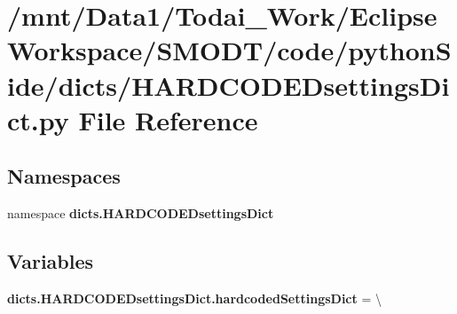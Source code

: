 \section{/mnt/\-Data1/\-Todai\-\_\-\-Work/\-Eclipse\-Workspace/\-S\-M\-O\-D\-T/code/python\-Side/dicts/\-H\-A\-R\-D\-C\-O\-D\-E\-Dsettings\-Dict.py File Reference}
\label{_h_a_r_d_c_o_d_e_dsettings_dict_8py}
\subsection*{Namespaces}
\begin{DoxyCompactItemize}
\item 
namespace {\bf dicts.\-H\-A\-R\-D\-C\-O\-D\-E\-Dsettings\-Dict}
\end{DoxyCompactItemize}
\subsection*{Variables}
\begin{DoxyCompactItemize}
\item 
{\bf dicts.\-H\-A\-R\-D\-C\-O\-D\-E\-Dsettings\-Dict.\-hardcoded\-Settings\-Dict} = \textbackslash{}
\end{DoxyCompactItemize}
